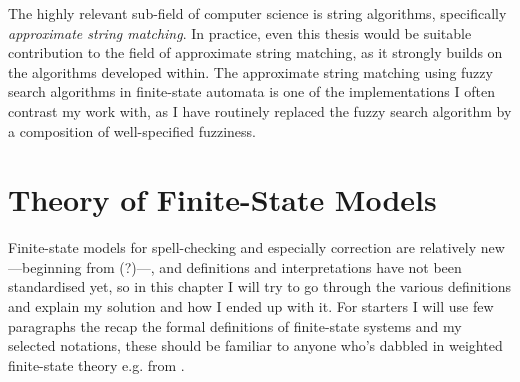\documentclass[officiallayout]{unihelcompling}
\begin{document}
The highly relevant sub-field of computer science is string algorithms,
specifically \emph{approximate string matching}. In practice, even this
thesis would be suitable contribution to the field of approximate string
matching, as it strongly builds on the algorithms developed within. The
approximate string matching using fuzzy search algorithms in finite-state
automata is one of the implementations I often contrast my work with, as
I have routinely replaced the fuzzy search algorithm by a composition of
well-specified fuzziness.

\section{Theory of Finite-State Models}

Finite-state models for spell-checking and especially correction are relatively
new---beginning from \citep{oflazer1996errortolerant}(?)---, and definitions
and interpretations have not been standardised yet, so in this chapter I will
try to go through the various definitions and explain my solution and how I
ended up with it. For starters I will use few paragraphs the recap the formal
definitions of finite-state systems and my selected notations, these should be
familiar to anyone who's dabbled in weighted finite-state theory e.g. from
\citep{aho2007compilers,mohri1997finitestate}.
\end{document}
